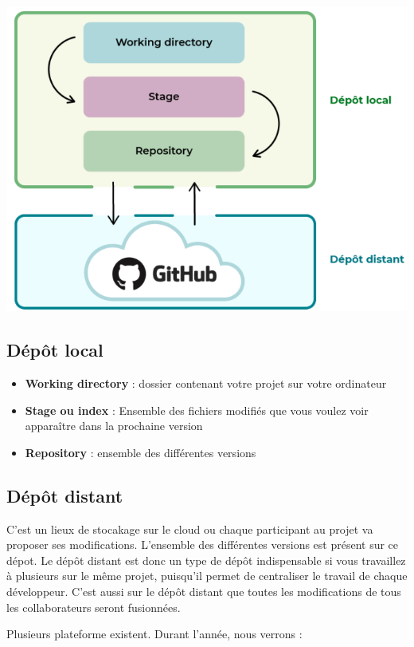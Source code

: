 \documentclass[french, 12pt]{article}%
\newcommand{\itemE}{\item[$\bullet$]}
\begin{document}
\begin{center}
\includegraphics[scale=0.5]{./ressource/fctTGit}
\end{center}

\subsection{Dépôt local }

\begin{itemize}
\itemE \textbf{Working directory} : dossier contenant votre projet sur votre ordinateur
\itemE \textbf{Stage ou index} : Ensemble des fichiers modifiés que vous voulez voir apparaître dans la prochaine version
\itemE \textbf{Repository} : ensemble des différentes versions
\end{itemize}

\subsection{Dépôt distant}

C'est un lieux de stocakage sur le cloud ou chaque participant au projet va proposer ses modifications. L'ensemble des différentes versions est présent sur ce dépot. 
Le dépôt distant est donc un type de dépôt indispensable si vous travaillez à plusieurs sur le même projet, puisqu’il permet de centraliser le travail de chaque développeur. C’est aussi sur le dépôt distant que toutes les modifications de tous les collaborateurs seront fusionnées.

Plusieurs plateforme existent. Durant l'année, nous verrons : 
\end{document}
